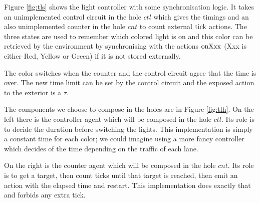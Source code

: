 \documentclass{article}
\begin{document}
Figure \ref{fig:tls} shows the light controller with some synchronisation logic.
It  takes an unimplemented control circuit in the hole \(ctl\) which gives the timings and an also unimplemented counter in the hole \(cnt\) to count external \(\mathrm{tick}\) actions.
The three states are used to remember which colored light is on and this color can be retrieved by the environment by synchronising with the actions \(\mathrm{onXxx}\) (Xxx is either Red, Yellow or Green) if it is not stored externally.

The color switches when the counter and the control circuit agree that the time is over.
The new time limit can be set by the control circuit and the exposed action to the exterior is a \(\tau\).

The components we choose to compose in the holes are in Figure \ref{fig:tlh}.
On the left there is the controller agent which will be composed in the hole \(ctl\).
Its role is to decide the duration before switching the lights.
This implementation is simply a constant time for each color; we could imagine using a more fancy controller which decides of the time depending on the traffic of each lane.

On the right is the counter agent which will be composed in the hole \(cnt\).
Its role is to get a target, then count ticks until that target is reached, then emit an action with the elapsed time and restart.
This implementation does exactly that and forbids any extra tick.
\end{document}
